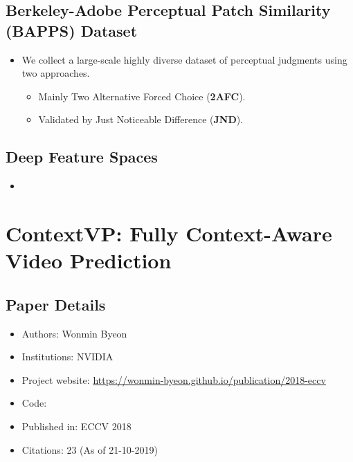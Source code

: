 \documentclass{article}
\begin{document}
    \subsection{Berkeley-Adobe Perceptual Patch Similarity (BAPPS) Dataset}\label{subsec:The_Unreasonable_Effectiveness_of_Deep_Features_as_a_Perceptual_Metric:bappsdataset}
    \begin{itemize}
        \item We collect a large-scale highly diverse dataset of perceptual judgments using two approaches.
        \begin{itemize}
            \item Mainly Two Alternative Forced Choice (\textbf{2AFC}).
            \item Validated by Just Noticeable Difference (\textbf{JND}).
        \end{itemize}
    \end{itemize}

    \subsection{Deep Feature Spaces}\label{subsec:The_Unreasonable_Effectiveness_of_Deep_Features_as_a_Perceptual_Metric:deep-feature-spaces}
    \begin{itemize}
        \item
    \end{itemize}
    \newpage


    \section{ContextVP: Fully Context-Aware Video Prediction}\label{sec:ContextVP_Fully_Context_Aware_Video_Prediction}
    \subsection*{Paper Details}
    \begin{itemize}
        \item Authors: Wonmin Byeon
        \item Institutions: NVIDIA
        \item Project website: \url{https://wonmin-byeon.github.io/publication/2018-eccv}
        \item Code:
        \item Published in: ECCV 2018
        \item Citations: 23 (As of 21-10-2019)
    \end{itemize}
\end{document}
